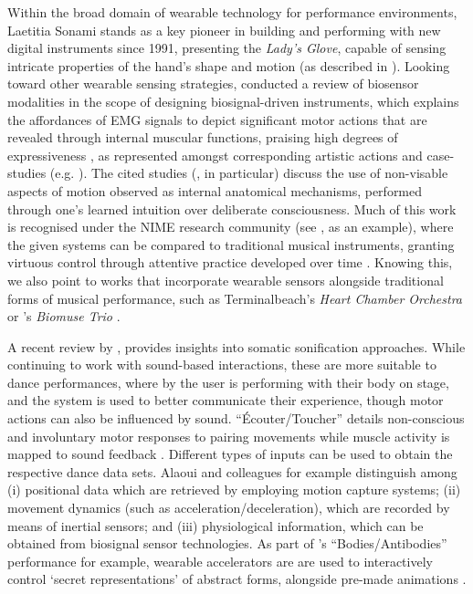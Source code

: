 Within the broad domain of wearable technology for performance environments, Laetitia Sonami stands as a key pioneer in building and performing with new digital instruments since 1991, presenting the \textit{Lady's Glove}, capable of sensing intricate properties of the hand's shape and motion (as described in \cite{Bongers2000PhysicalII}). Looking toward other wearable sensing strategies, \citeauthor{aly_appropriating_2021} conducted a review of biosensor modalities in the scope of designing biosignal-driven instruments, which explains the affordances of EMG signals to depict significant motor actions that are revealed through internal muscular functions, praising high degrees of expressiveness \cite{aly_appropriating_2021}, as represented amongst corresponding artistic actions and case-studies (e.g. \cite{francoise_coda_2022,erdem_vrengt_2020,lesaffre_sonic_2017,caramiaux_understanding_2015}). The cited studies (\cite{erdem_vrengt_2020}, in particular) discuss the use of non-visable aspects of motion observed as internal anatomical mechanisms, performed through one's learned intuition over deliberate consciousness. Much of this work is recognised under the NIME research community (see \cite{fiebrink_rebecca_reflections_2020}, as an example), where the given systems can be compared to traditional musical instruments, granting virtuous control through attentive practice developed over time \cite{wu_supporting_2017}. Knowing this, we also point to works that incorporate wearable sensors alongside traditional forms of musical performance, such as Terminalbeach's \textit{Heart Chamber Orchestra} \cite{votava_heart_2012} or \citeauthor{lyon_biomuse_2010}'s \textit{Biomuse Trio} \cite{lyon_biomuse_2010}.

A recent review by \citeauthor{giomi_somatic_2020}, provides insights into somatic sonification approaches. While continuing to work with sound-based interactions, these are more suitable to dance performances, where by the user is performing with their body on stage, and the system is used to better communicate their experience, though motor actions can also be influenced by sound. “Écouter/Toucher” details non-conscious and involuntary motor responses to pairing movements while muscle activity is mapped to sound feedback \cite{giomi_listening_2018}. Different types of inputs can be used to obtain the respective dance data sets. Alaoui and colleagues \cite{fdili_alaoui_seeing_2017} for example distinguish among (i) positional data which are retrieved by employing motion capture systems; (ii) movement dynamics (such as acceleration/deceleration), which are recorded by means of inertial sensors; and (iii) physiological information, which can be obtained from biosignal sensor technologies. As part of \citeauthor{latulipe2010exploring}'s “Bodies/Antibodies” performance for example, wearable accelerators are are used to interactively control ‘secret representations’ of abstract forms, alongside pre-made animations \cite{latulipe2010exploring}.

